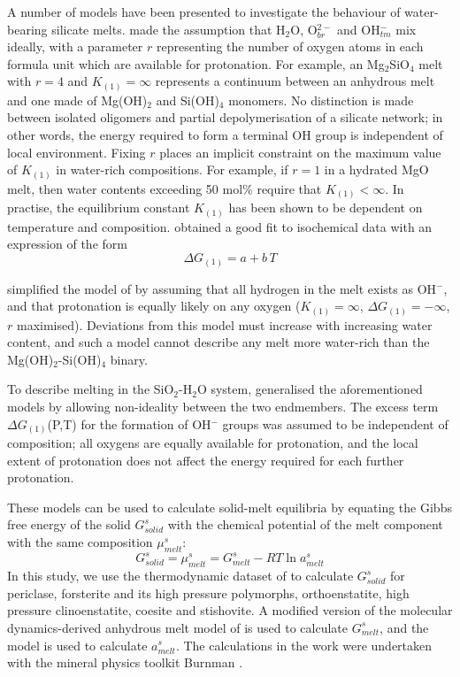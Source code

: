 \documentclass[review]{elsarticle}
\begin{document}
A number of models have been presented to investigate the behaviour of water-bearing silicate melts. \cite{SS1985} made the assumption that H$_2$O, O$_{br}^{2-}$ and OH$_{tm}^-$ mix ideally, with a parameter $r$ representing the number of oxygen atoms in each formula unit which are available for protonation. For example, an Mg$_2$SiO$_4$ melt with $r=4$ and $K_{(1)}=\infty$ represents a continuum between an anhydrous melt and one made of Mg(OH)$_2$ and Si(OH)$_4$ monomers. No distinction is made between isolated oligomers and partial depolymerisation of a silicate network; in other words, the energy required to form a terminal OH group is independent of local environment. Fixing $r$ places an implicit constraint on the maximum value of $K_{(1)}$ in water-rich compositions. For example, if $r=1$ in a hydrated MgO melt, then water contents exceeding 50 mol\% require that $K_{(1)}<\infty$. In practise, the equilibrium constant $K_{(1)}$ has been shown to be dependent on temperature and composition. \cite{SK1995} obtained a good fit to isochemical data with an expression of the form
\begin{equation}
\Delta G_{(1)} = a + b\,T
\end{equation}

\cite{THH2012} simplified the model of \cite{SS1985} by assuming that all hydrogen in the melt exists as OH$^-$, and that protonation is equally likely on any oxygen ($K_{(1)}=\infty$, $\Delta G_{(1)}=-\infty$, $r$ maximised). Deviations from this model must increase with increasing water content, and such a model cannot describe any melt more water-rich than the Mg(OH)$_2$-Si(OH)$_4$ binary. 

To describe melting in the SiO$_2$-H$_2$O system, \cite{HM2012} generalised the aforementioned models by allowing non-ideality between the two endmembers. The excess term $\Delta G_{(1)}$(P,T) for the formation of OH$^-$ groups was assumed to be independent of composition; all oxygens are equally available for protonation, and the local extent of protonation does not affect the energy required for each further protonation.


These models can be used to calculate solid-melt equilibria by equating the Gibbs free energy of the solid $G^s_{solid}$ with the chemical potential of the melt component with the same composition $\mu^s_{melt}$:
\begin{equation}
G^s_{solid} = \mu^s_{melt} = G^s_{melt} - RT \ln a^s_{melt}
\label{eqn:equilibrium}
\end{equation}
In this study, we use the thermodynamic dataset of \cite{SLB2011} to calculate $G^s_{solid}$ for periclase, forsterite and its high pressure polymorphs, orthoenstatite, high pressure clinoenstatite, coesite and stishovite. A modified version of the molecular dynamics-derived anhydrous melt model of \cite{DKS2013} is used to calculate $G^s_{melt}$, and the \cite{SS1985} model is used to calculate $a^s_{melt}$. The calculations in the work were undertaken with the mineral physics toolkit Burnman \citep[available from \url{https://geodynamics.org/cig/software/burnman/};][]{CHRU2014}. 
\end{document}
